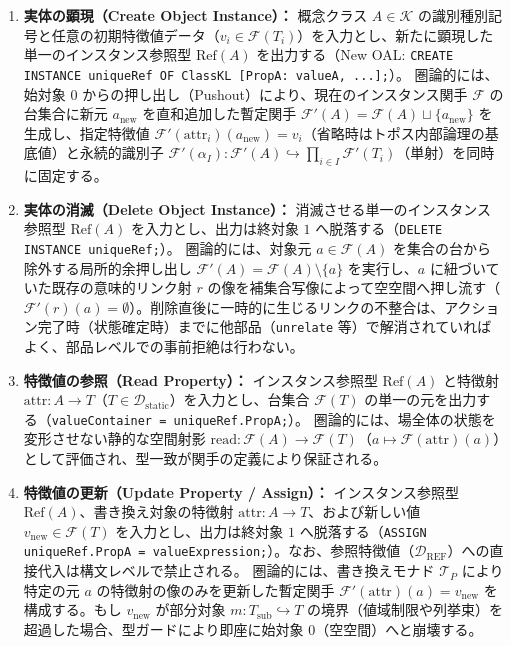 \documentclass[11pt,a4paper]{ltjsarticle}
\theoremstyle{definition}
\theoremstyle{plain}
\theoremstyle{remark}
\newcommand{\Dstatic}{\mathcal{D}_{\mathrm{static}}}
\newcommand{\Dref}{\mathcal{D}_{\mathrm{REF}}}
\begin{document}
\begin{enumerate}[label=\textbf{(\arabic*)}, leftmargin=*]
    \item \textbf{実体の顕現（Create Object Instance）：}
    概念クラス $A \in \mathcal{K}$ の識別種別記号と任意の初期特徴値データ（$v_i \in \mathcal{F}(T_i)$）を入力とし、新たに顕現した単一のインスタンス参照型 $\mathrm{Ref}(A)$ を出力する（New OAL: \texttt{CREATE INSTANCE uniqueRef OF ClassKL [PropA: valueA, ...];}）。
    圏論的には、始対象 $0$ からの押し出し（Pushout）により、現在のインスタンス関手 $\mathcal{F}$ の台集合に新元 $a_{\mathrm{new}}$ を直和追加した暫定関手 $\mathcal{F}'(A) = \mathcal{F}(A) \sqcup \{a_{\mathrm{new}}\}$ を生成し、指定特徴値 $\mathcal{F}'(\mathrm{attr}_i)(a_{\mathrm{new}}) = v_i$（省略時はトポス内部論理の基底値）と永続的識別子 $\mathcal{F}'(\alpha_I) : \mathcal{F}'(A) \hookrightarrow \prod_{i \in I} \mathcal{F}'(T_i)$（単射）を同時に固定する。

    \item \textbf{実体の消滅（Delete Object Instance）：}
    消滅させる単一のインスタンス参照型 $\mathrm{Ref}(A)$ を入力とし、出力は終対象 $1$ へ脱落する（\texttt{DELETE INSTANCE uniqueRef;}）。
    圏論的には、対象元 $a \in \mathcal{F}(A)$ を集合の台から除外する局所的余押し出し $\mathcal{F}'(A) = \mathcal{F}(A) \setminus \{a\}$ を実行し、$a$ に紐づいていた既存の意味的リンク射 $r$ の像を補集合写像によって空空間へ押し流す（$\mathcal{F}'(r)(a) = \emptyset$）。削除直後に一時的に生じるリンクの不整合は、アクション完了時（状態確定時）までに他部品（\texttt{unrelate} 等）で解消されていればよく、部品レベルでの事前拒絶は行わない。

    \item \textbf{特徴値の参照（Read Property）：}
    インスタンス参照型 $\mathrm{Ref}(A)$ と特徴射 $\mathrm{attr} : A \to T$（$T \in \Dstatic$）を入力とし、台集合 $\mathcal{F}(T)$ の単一の元を出力する（\texttt{valueContainer = uniqueRef.PropA;}）。
    圏論的には、場全体の状態を変形させない静的な空間射影 $\mathrm{read} : \mathcal{F}(A) \to \mathcal{F}(T)$（$a \mapsto \mathcal{F}(\mathrm{attr})(a)$）として評価され、型一致が関手の定義により保証される。

    \item \textbf{特徴値の更新（Update Property / Assign）：}
    インスタンス参照型 $\mathrm{Ref}(A)$、書き換え対象の特徴射 $\mathrm{attr} : A \to T$、および新しい値 $v_{\mathrm{new}} \in \mathcal{F}(T)$ を入力とし、出力は終対象 $1$ へ脱落する（\texttt{ASSIGN uniqueRef.PropA = valueExpression;}）。なお、参照特徴値（$\Dref$）への直接代入は構文レベルで禁止される。
    圏論的には、書き換えモナド $\mathcal{T}_P$ \cite{moggi1991} により特定の元 $a$ の特徴射の像のみを更新した暫定関手 $\mathcal{F}'(\mathrm{attr})(a) = v_{\mathrm{new}}$ を構成する。もし $v_{\mathrm{new}}$ が部分対象 $m : T_{\mathrm{sub}} \hookrightarrow T$ の境界（値域制限や列挙束）を超過した場合、型ガードにより即座に始対象 $0$（空空間）へと崩壊する。


\end{enumerate}
\end{document}
